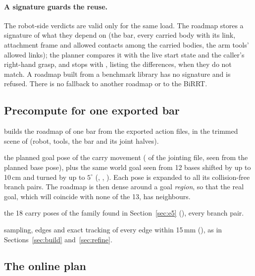\paragraph{A signature guards the reuse.} The robot-side verdicts are valid only
for the same load. The roadmap stores a signature of what they depend on (the
bar, every carried body with its link, attachment frame and allowed contacts
among the carried bodies, the arm tools' allowed links); the planner compares it
with the live start state and the caller's right-hand grasp, and stops with
, listing the differences, when they do not match. A
roadmap built from a benchmark library has no signature and is refused. There
is no fallback to another roadmap or to the BiRRT.

\subsection{Precompute for one exported bar}

 builds the roadmap of
one bar from the exported action files, in the trimmed scene of
 (robot, tools, the bar and its joint halves).

\begin{description}[nosep,leftmargin=1.5em]
  \item[goal anchors] the planned goal pose of the carry movement
        ( of the jointing file, seen from the planned base
        pose), plus the same world goal seen from 12 bases shifted by up to
        10\,cm and turned by up to $5^\circ$ (,
        , ). Each pose is expanded to
        all its collision-free branch pairs. The roadmap is then dense around a
        goal \emph{region}, so that the real goal, which will coincide with none of
        the 13, has neighbours.
  \item[start anchors] the 18 carry poses of the family found in
        Section~\ref{sec:e5} (), every
        branch pair.
  \item[the rest] sampling, edges and exact tracking of every edge within 15\,mm
        (), as in Sections~\ref{sec:build}
        and~\ref{sec:refine}.
\end{description}

\subsection{The online plan}
\label{sec:online}

